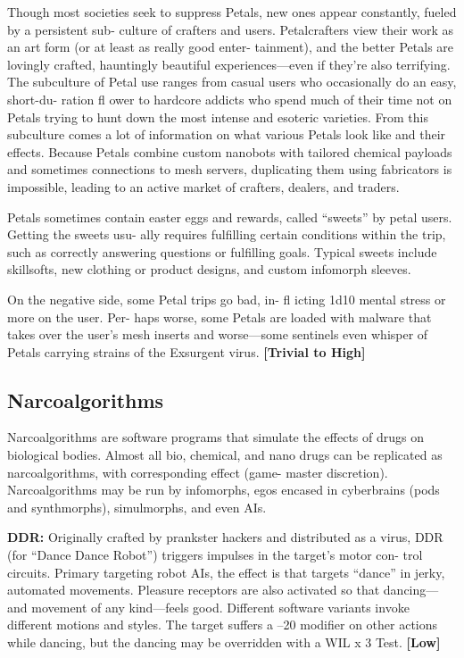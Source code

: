 Though most societies seek to suppress Petals, new 
ones appear constantly, fueled by a persistent sub-
culture of crafters and users. Petalcrafters view their 
work as an art form (or at least as really good enter-
tainment), and the better Petals are lovingly crafted, 
hauntingly beautiful experiences—even if they're also 
terrifying. The subculture of Petal use ranges from 
casual users who occasionally do an easy, short-du-
ration fl ower to hardcore addicts who spend much of 
their time not on Petals trying to hunt down the most 
intense and esoteric varieties. From this subculture 
comes a lot of information on what various Petals 
look like and their effects. Because Petals combine 
custom nanobots with tailored chemical payloads and 
sometimes connections to mesh servers, duplicating 
them using fabricators is impossible, leading to an 
active market of crafters, dealers, and traders.

Petals sometimes contain easter eggs and rewards, 
called ``sweets'' by petal users. Getting the sweets usu-
ally requires fulfilling certain conditions within the 
trip, such as correctly answering questions or fulfilling 
goals. Typical sweets include skillsofts, new clothing 
or product designs, and custom infomorph sleeves.

On the negative side, some Petal trips go bad, in-
fl icting 1d10 mental stress or more on the user. Per-
haps worse, some Petals are loaded with malware that 
takes over the user's mesh inserts and worse—some 
sentinels even whisper of Petals carrying strains of the 
Exsurgent virus. \textbf{[Trivial to High]}

\subsection{Narcoalgorithms}

Narcoalgorithms are software programs that simulate 
the effects of drugs on biological bodies. Almost all 
bio, chemical, and nano drugs can be replicated as 
narcoalgorithms, with corresponding effect (game-
master discretion). Narcoalgorithms may be run by 
infomorphs, egos encased in cyberbrains (pods and 
synthmorphs), simulmorphs, and even AIs.

\textbf{DDR:} Originally crafted by prankster hackers 
and distributed as a virus, DDR (for ``Dance Dance 
Robot'') triggers impulses in the target's motor con-
trol circuits. Primary targeting robot AIs, the effect is 
that targets ``dance'' in jerky, automated movements. 
Pleasure receptors are also activated so that dancing—
and movement of any kind—feels good. Different 
software variants invoke different motions and styles. 
The target suffers a –20 modifier on other actions 
while dancing, but the dancing may be overridden 
with a WIL x 3 Test. \textbf{[Low]}

